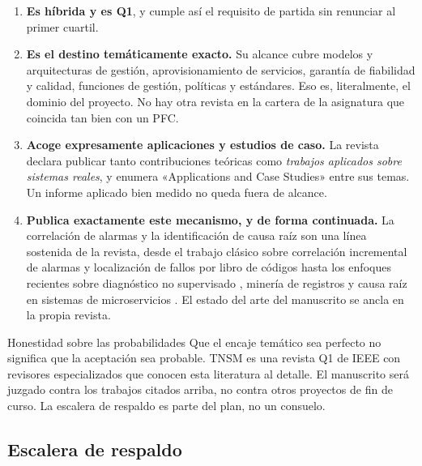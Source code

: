 \documentclass[11pt,a4paper]{article}
\begin{document}
\begin{enumerate}[leftmargin=*,itemsep=5pt]
	\item \textbf{Es híbrida y es Q1}, y cumple así el requisito de partida sin renunciar al primer cuartil.
	\item \textbf{Es el destino temáticamente exacto.} Su alcance cubre modelos y arquitecturas de gestión, aprovisionamiento de servicios, garantía de fiabilidad y calidad, funciones de gestión, políticas y estándares. Eso es, literalmente, el dominio del proyecto. No hay otra revista en la cartera de la asignatura que coincida tan bien con un PFC.
	\item \textbf{Acoge expresamente aplicaciones y estudios de caso.} La revista declara publicar tanto contribuciones teóricas como \emph{trabajos aplicados sobre sistemas reales}, y enumera «Applications and Case Studies» entre sus temas. Un informe aplicado bien medido no queda fuera de alcance.
	\item \textbf{Publica exactamente este mecanismo, y de forma continuada.} La correlación de alarmas y la identificación de causa raíz son una línea sostenida de la revista, desde el trabajo clásico sobre correlación incremental de alarmas \cite{tang2008alarm} y localización de fallos por libro de códigos \cite{reali2018codebook} hasta los enfoques recientes sobre diagnóstico no supervisado \cite{mdini2020unsupervised}, minería de registros \cite{notaro2023logrule} y causa raíz en sistemas de microservicios \cite{yang2024micronet}. El estado del arte del manuscrito se ancla en la propia revista.
\end{enumerate}

\begin{alerta}{Honestidad sobre las probabilidades}
	Que el encaje temático sea perfecto no significa que la aceptación sea probable. TNSM es una revista Q1 de IEEE con revisores especializados que conocen esta literatura al detalle. El manuscrito será juzgado contra los trabajos citados arriba, no contra otros proyectos de fin de curso. La escalera de respaldo es parte del plan, no un consuelo.
\end{alerta}

\subsection{Escalera de respaldo}
\end{document}
